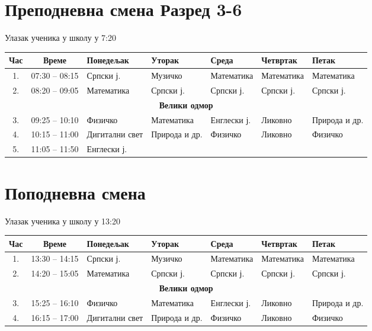 \documentclass[14pt]{extarticle}
\begin{document}
\section*{Преподневна смена \hfill \normalfont Разред 3-6}
\noindent Улазак ученика у школу у 7:20


\bigskip
\noindent
\begin{tabularx}{\textwidth}{|c|c|X|X|X|X|X|}
\hline
\textbf{Час} & \textbf{Време} & \textbf{Понедељак} & \textbf{Уторак} & \textbf{Среда} & \textbf{Четвртак} & \textbf{Петак} \\
\hline
1. & 07:30 -- 08:15 & Српски ј. & Музичко & Математика & Математика & Математика \\
\hline
2. & 08:20 -- 09:05 & Математика & Српски ј. & Српски ј. & Српски ј. & Српски ј. \\
\hline
\multicolumn{7}{|c|}{\textbf{Велики одмор}} \\
\hline
3. & 09:25 -- 10:10 & Физичко & Математика & Енглески ј. & Ликовно & Природа и др. \\
\hline
4. & 10:15 -- 11:00 & Дигитални свет & Природа и др. & Физичко & Ликовно & Физичко \\
\hline
5. & 11:05 -- 11:50 & Енглески ј. &  & &  &   \\
\hline
\end{tabularx}

\bigskip
\section*{Поподневна смена}
\noindent Улазак ученика у школу у 13:20

\bigskip
\noindent
\begin{tabularx}{\textwidth}{|c|c|X|X|X|X|X|}
\hline
\textbf{Час} & \textbf{Време} & \textbf{Понедељак} & \textbf{Уторак} & \textbf{Среда} & \textbf{Четвртак} & \textbf{Петак} \\
\hline
1. & 13:30 -- 14:15 & Српски ј. & Музичко & Математика & Математика & Математика \\
\hline
2. & 14:20 -- 15:05 & Математика & Српски ј. & Српски ј. & Српски ј. & Српски ј. \\
\hline
\multicolumn{7}{|c|}{\textbf{Велики одмор}} \\
\hline
3. & 15:25 -- 16:10 & Физичко & Математика & Енглески ј. & Ликовно & Природа и др. \\
\hline
4. & 16:15 -- 17:00 & Дигитални свет & Природа и др. & Физичко & Ликовно & Физичко \\
\hline
\end{tabularx}
\end{document}

